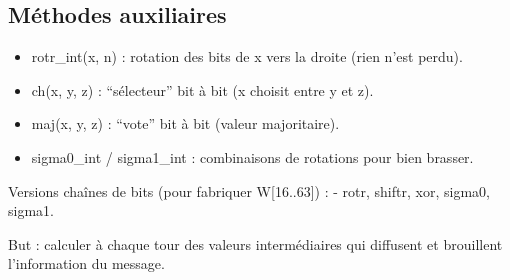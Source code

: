 \documentclass[11pt]{article}
\providecommand{\tightlist}{%
      \setlength{\itemsep}{0pt}\setlength{\parskip}{0pt}}
\begin{document}
    \subsection{Méthodes auxiliaires}\label{muxe9thodes-auxiliaires}

\begin{itemize}
\tightlist
\item
  rotr\_int(x, n) : rotation des bits de x vers la droite (rien n'est
  perdu).
\item
  ch(x, y, z) : ``sélecteur'' bit à bit (x choisit entre y et z).
\item
  maj(x, y, z) : ``vote'' bit à bit (valeur majoritaire).
\item
  sigma0\_int / sigma1\_int : combinaisons de rotations pour bien
  brasser.
\end{itemize}

Versions chaînes de bits (pour fabriquer W{[}16..63{]}) : - rotr,
shiftr, xor, sigma0, sigma1.

But : calculer à chaque tour des valeurs intermédiaires qui diffusent et
brouillent l'information du message.
\end{document}
